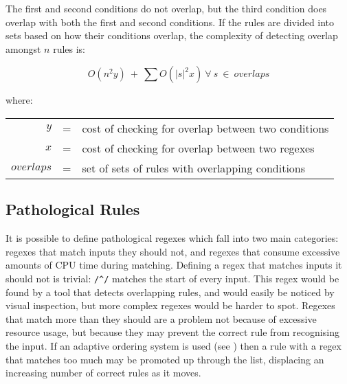\noindent{}The first and second conditions do not overlap, but the third
condition does overlap with both the first and second conditions.  If the
rules are divided into sets based on how their conditions overlap, the
complexity of detecting overlap amongst $n$ rules is:

$$O(n^{2}y)~+~\sum{O(|s|^{2}x)~\forall{}~s~\in{}~overlaps}$$

where:

\begin{tabular}[]{rcl}

            $y$ & = & cost of checking for overlap between two conditions \\
            $x$ & = & cost of checking for overlap between two regexes    \\
     $overlaps$ & = & set of sets of rules with overlapping conditions    \\

\end{tabular}

\subsection{Pathological Rules}

It is possible to define pathological regexes which fall into two main
categories: regexes that match inputs they should not, and regexes that
consume excessive amounts of CPU time during matching.  Defining a regex
that matches inputs it should not is trivial: \verb!/^/! matches the start
of every input.  This regex would be found by a tool that detects
overlapping rules, and would easily be noticed by visual inspection, but
more complex regexes would be harder to spot.  Regexes that match more than
they should are a problem not because of excessive resource usage, but
because they may prevent the correct rule from recognising the input.  If
an adaptive ordering system is used (see ) then a rule with a regex that matches too much may be promoted
up through the list, displacing an increasing number of correct rules as it
moves.

